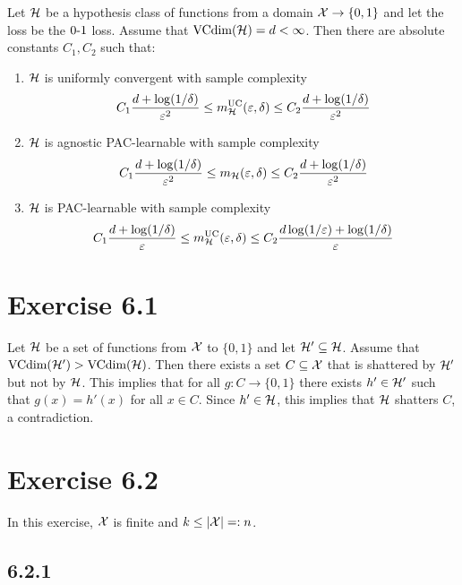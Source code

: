 \begin{theorem}
Let $\mathcal{H}$ be a hypothesis class of functions from a domain
$\mathcal{X} \rightarrow \{0, 1\}$ and let the loss be the $\operatorname{0-1}$ loss. Assume that
$\text{VCdim}(\mathcal{H}) = d < \infty$. Then there are absolute constants $C_1, C_2$
such that:
\begin{enumerate}
    \item $\mathcal{H}$ is uniformly convergent with sample complexity
        \[
            C_1 \frac{d + \log (1 / \delta)}{\varepsilon^2}
            \leq m_{\mathcal{H}}^{\text{UC}}(\varepsilon, \delta)
            \leq C_2 \frac{d + \log (1 / \delta)}{\varepsilon^2}
        \]
    \item $\mathcal{H}$ is agnostic PAC-learnable with sample complexity
        \[
            C_1 \frac{d + \log (1 / \delta)}{\varepsilon^2}
            \leq m_{\mathcal{H}}(\varepsilon, \delta)
            \leq C_2 \frac{d + \log (1 / \delta)}{\varepsilon^2}
        \]
    \item $\mathcal{H}$ is PAC-learnable with sample complexity
        \[
            C_1 \frac{d + \log (1 / \delta)}{\varepsilon}
            \leq m_{\mathcal{H}}^{\text{UC}}(\varepsilon, \delta)
            \leq C_2 \frac{d \log (1 / \varepsilon) + \log (1 / \delta)}{\varepsilon}
        \]
\end{enumerate}
\end{theorem}

\section*{Exercise 6.1}

Let $\mathcal{H}$ be a set of functions from $\mathcal{X}$ to $\{0, 1\}$ and
let $\mathcal{H}' \subseteq \mathcal{H}$. Assume that $\text{VCdim} (\mathcal{H}') > \text{VCdim}
(\mathcal{H})$.  Then there exists a set $C \subseteq \mathcal{X}$ that is shattered by
$\mathcal{H}'$ but not by $\mathcal{H}$.  This implies that for all $g \colon C
\rightarrow \{0, 1\}$ there exists $h' \in \mathcal{H}'$ such that $g(x) = h'(x)$
for all $x \in C$. Since $h' \in \mathcal{H}$, this implies that $\mathcal{H}$
shatters $C$, a contradiction.

\section*{Exercise 6.2}

In this exercise, $\mathcal{X}$ is finite and $k \leq |\mathcal{X}| =: n$.

\subsection*{6.2.1}

